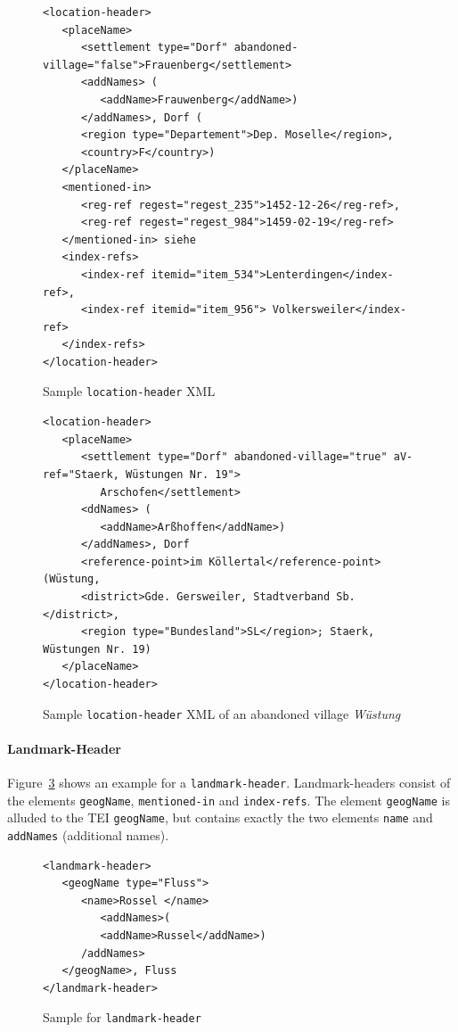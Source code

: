 \begin{figure}[H]
\centering
\begin{verbatim}
<location-header>
   <placeName>
      <settlement type="Dorf" abandoned-village="false">Frauenberg</settlement>
      <addNames> (
         <addName>Frauwenberg</addName>)
      </addNames>, Dorf (
      <region type="Departement">Dep. Moselle</region>, 
      <country>F</country>) 
   </placeName>
   <mentioned-in>
      <reg-ref regest="regest_235">1452-12-26</reg-ref>, 
      <reg-ref regest="regest_984">1459-02-19</reg-ref>
   </mentioned-in> siehe 
   <index-refs>
      <index-ref itemid="item_534">Lenterdingen</index-ref>,
      <index-ref itemid="item_956"> Volkersweiler</index-ref>
   </index-refs>
</location-header>
\end{verbatim}
\caption{Sample \texttt{location-header} XML}
\label{fig:location-header-xml}
\end{figure}

\begin{figure}[H]
\centering
\begin{verbatim}
<location-header>
   <placeName>
      <settlement type="Dorf" abandoned-village="true" aV-ref="Staerk, Wüstungen Nr. 19">
         Arschofen</settlement>
      <ddNames> (
         <addName>Arßhoffen</addName>)
      </addNames>, Dorf 
      <reference-point>im Köllertal</reference-point> (Wüstung, 
      <district>Gde. Gersweiler, Stadtverband Sb.</district>, 
      <region type="Bundesland">SL</region>; Staerk, Wüstungen Nr. 19) 
   </placeName>
</location-header>
\end{verbatim}
\caption{Sample \texttt{location-header} XML of an abandoned village \textit{Wüstung}}
\label{fig:location-wuest-xml}
\end{figure}


\paragraph{Landmark-Header}
Figure~\ref{fig:landmark-header-xml} shows an example for a \texttt{landmark-header}. Landmark-headers consist of the elements \texttt{geogName}, \texttt{mentioned-in} and \texttt{index-refs}. The element \texttt{geogName} is alluded to the TEI \texttt{geogName}, but contains exactly the two elements \texttt{name} and \texttt{addNames} (additional names).

\begin{figure}[H]
\centering
\begin{verbatim}
<landmark-header>
   <geogName type="Fluss">
      <name>Rossel </name>
         <addNames>(
         <addName>Russel</addName>)
      /addNames>
   </geogName>, Fluss 
</landmark-header>
\end{verbatim}
\caption{Sample for \texttt{landmark-header}}
\label{fig:landmark-header-xml}
\end{figure}

